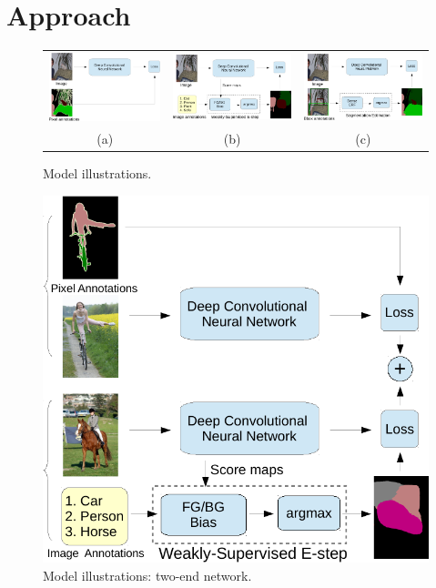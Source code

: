 \section{Approach}

\begin{figure}[ht]
  \centering
  \begin{tabular}{c c c}
    \includegraphics[height=0.17\linewidth]{fig/model_train_pixel.pdf} & 
    \includegraphics[height=0.17\linewidth]{fig/model_train_image.pdf} & 
    \includegraphics[height=0.17\linewidth]{fig/model_train_bbox.pdf}  \\
    (a) &
    (b) &
    (c) 
  \end{tabular}
  \caption{Model illustrations.}
  \label{fig:model_illustrations}
\end{figure}

\begin{figure}[ht]
  \centering
  \includegraphics[width=0.9\linewidth]{fig/model_train_twoEnd.pdf} 
  \caption{Model illustrations: two-end network.}
  \label{fig:model_illustrations_twoEnd}
\end{figure}



 

